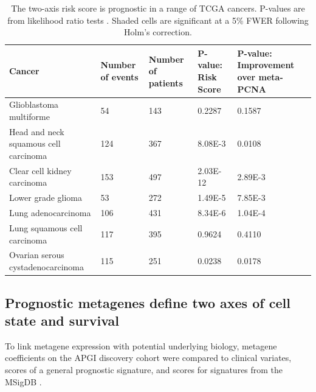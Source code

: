 \documentclass[dissertation.tex]{subfiles}
\begin{document}
\begin{table}[h]
\caption{The two-axis risk score is prognostic in a range of \acrshort{TCGA} cancers.  P-values are from likelihood ratio tests .  Shaded cells are significant at a 5\% \gls{FWER} following Holm's correction. \label{tab:sigs-validation-tcga}}
\begin{tabular}{@{}lllll@{}}
\toprule
Cancer                                & Number of events & Number of patients & P-value: Risk Score              & P-value: Improvement over meta-PCNA \\ \midrule
Glioblastoma multiforme               & 54               & 143                & 0.2287                           & 0.1587                              \\
Head and neck squamous cell carcinoma & 124              & 367                & \cellcolor[HTML]{C0C0C0}8.08E-3  & 0.0108                              \\
Clear cell kidney carcinoma           & 153              & 497                & \cellcolor[HTML]{C0C0C0}2.03E-12 & \cellcolor[HTML]{C0C0C0}2.89E-3     \\
Lower grade glioma                    & 53               & 272                & \cellcolor[HTML]{C0C0C0}1.49E-5  & \cellcolor[HTML]{C0C0C0}7.85E-3     \\
Lung adenocarcinoma                   & 106              & 431                & \cellcolor[HTML]{C0C0C0}8.34E-6  & \cellcolor[HTML]{C0C0C0}1.04E-4     \\
Lung squamous cell carcinoma          & 117              & 395                & 0.9624                           & 0.4110                              \\
Ovarian serous cystadenocarcinoma     & 115              & 251                & 0.0238                           & 0.0178                              \\ \bottomrule
\end{tabular}
\end{table}



\subsection{Prognostic metagenes define two axes of cell state and survival}
To link metagene expression with potential underlying biology, metagene coefficients on the \gls{APGI} discovery cohort were compared to clinical variates, scores of a general prognostic signature, and scores for signatures from the \gls{MSigDB} \cite{Subramanian2005}.
\end{document}
